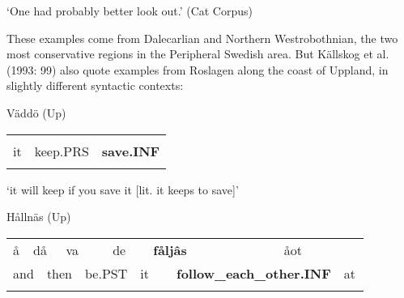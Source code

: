 \begin{styleTranslation}
‘One had probably better look out.’ (Cat Corpus)

\end{styleTranslation}

\begin{styleBodyTextFirst}
These examples come from Dalecarlian and Northern Westrobothnian, the two most conservative regions in the Peripheral Swedish area. But Källskog et al. (1993: 99) also quote examples from Roslagen along the coast of Uppland, in slightly different syntactic contexts:

\end{styleBodyTextFirst}

\begin{listWWNumileveli}
\item 

\begin{styleExample}
Väddö (Up)

\end{styleExample}

\end{listWWNumileveli}

\begin{tabular}{lll}
\lsptoprule
\multicolumn{3}{l}{de

}\\
it & keep.PRS & {\bfseries save.INF}\\
\lspbottomrule
\end{tabular}

\begin{styleTranslation}
‘it will keep if you save it [lit. it keeps to save]’

\end{styleTranslation}

\begin{listWWNumileveli}
\item 

\begin{styleExample}
Hållnäs (Up)

\end{styleExample}

\end{listWWNumileveli}

\begin{tabular}{llllllllllll}
\lsptoprule
å & \multicolumn{2}{l}{då

} & \multicolumn{2}{l}{va

} & \multicolumn{2}{l}{de

} & \multicolumn{2}{l}{{\bfseries fåljâs}

} & \multicolumn{2}{l}{åot

} & \\
\multicolumn{2}{l}{and

} & \multicolumn{2}{l}{then

} & \multicolumn{2}{l}{be.PST

} & \multicolumn{2}{l}{it

} & \multicolumn{2}{l}{{\bfseries follow\_each\_other.INF}

} & \multicolumn{2}{l}{at

}\\
\lspbottomrule
\end{tabular}

